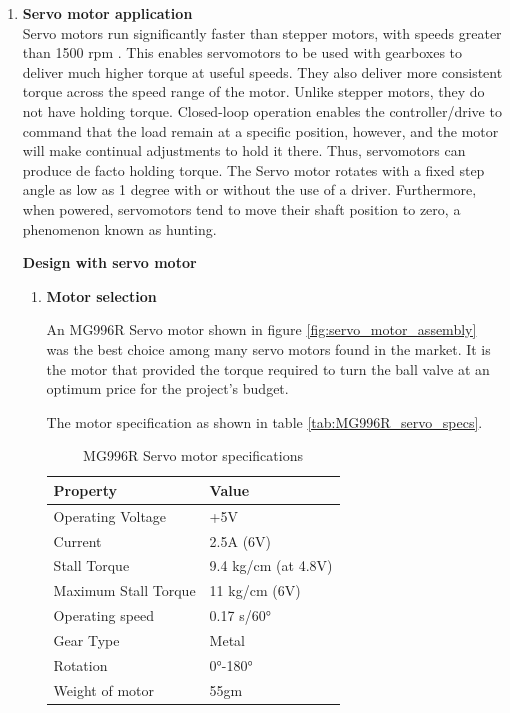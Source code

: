 \begin{enumerate}
    
    \item \textbf{Servo motor application}\\
    Servo motors run significantly faster than stepper motors, with speeds greater than 1500 rpm \cite{halicioglu2016mechanisms}. This enables servomotors to be used with gearboxes to deliver much higher torque at useful speeds. They also deliver more consistent torque across the speed range of the motor. Unlike stepper motors, they do not have holding torque. Closed-loop operation enables the controller/drive to command that the load remain at a specific position, however, and the motor will make continual adjustments to hold it there. Thus, servomotors can produce de facto holding torque\cite{halicioglu2016mechanisms}. The Servo motor rotates with a fixed step angle as low as 1 degree with or without the use of a driver. Furthermore, when powered, servomotors tend to move their shaft position to zero, a phenomenon known as hunting.
    \par
    \textbf{Design with servo motor}
    \begin{enumerate}
    \par
    \item \textbf{Motor selection}
    \par
    An MG996R Servo motor shown in figure \ref{fig:servo_motor_assembly} was the best choice among many servo motors found in the market. It is the motor that provided the torque required to turn the ball valve at an optimum price for the project's budget. 
    \par
    The motor specification as shown in table \ref{tab:MG996R_servo_specs}.
    \begin{table}[H]
    \centering
    \caption[MG996R Servo motor specifications]{MG996R Servo motor specifications \cite{mg996r}}
    \begin{tabular}{|l|l|}
    \hline
    \textbf{Property} & \textbf{Value} \\ \hline
    Operating Voltage & +5V \\ \hline
    Current & 2.5A (6V) \\ \hline
    Stall Torque & 9.4 kg/cm (at 4.8V) \\ \hline
    Maximum Stall Torque & 11 kg/cm (6V) \\ \hline
    Operating speed & 0.17 s/60° \\ \hline
    Gear Type & Metal \\ \hline
    Rotation & 0°-180° \\ \hline
    Weight of motor & 55gm \\ \hline

\end{tabular}
\end{table}
\end{enumerate}
\end{enumerate}

